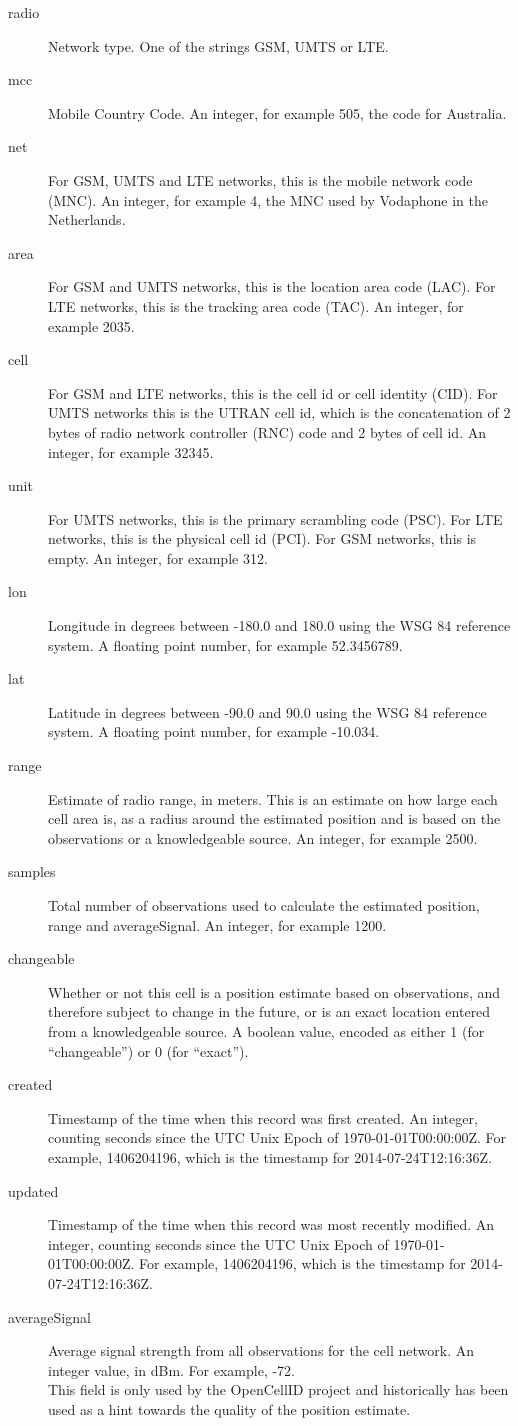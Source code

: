 \begin{description}
 \item[radio] Network type. One of the strings GSM, UMTS or LTE.
 \item[mcc] Mobile Country Code. An integer, for example 505, the code for Australia.
 \item[net] For GSM, UMTS and LTE networks, this is the mobile network code (MNC). An integer, for example 4, the MNC used by Vodaphone in the Netherlands.
 \item[area] For GSM and UMTS networks, this is the location area code (LAC). For LTE networks, this is the tracking area code (TAC). An integer, for example 2035.
 \item[cell] For GSM and LTE networks, this is the cell id or cell identity (CID). For UMTS networks this is the UTRAN cell id, which is the concatenation of 2 bytes of radio network controller (RNC) code and 2 bytes of cell id. An integer, for example 32345.
 \item[unit] For UMTS networks, this is the primary scrambling code (PSC). For LTE networks, this is the physical cell id (PCI). For GSM networks, this is empty. An integer, for example 312.
 \item[lon] Longitude in degrees between -180.0 and 180.0 using the WSG 84 reference system. A floating point number, for example 52.3456789.
 \item[lat] Latitude in degrees between -90.0 and 90.0 using the WSG 84 reference system. A floating point number, for example -10.034.
 \item[range] Estimate of radio range, in meters. This is an estimate on how large each cell area is, as a radius around the estimated position and is based on the observations or a knowledgeable source. An integer, for example 2500.
 \item[samples] Total number of observations used to calculate the estimated position, range and averageSignal. An integer, for example 1200.
 \item[changeable] Whether or not this cell is a position estimate based on observations, and therefore subject to change in the future, or is an exact location entered from a knowledgeable source. A boolean value, encoded as either 1 (for “changeable”) or 0 (for “exact”).
 \item[created] Timestamp of the time when this record was first created. An integer, counting seconds since the UTC Unix Epoch of 1970-01-01T00:00:00Z. For example, 1406204196, which is the timestamp for 2014-07-24T12:16:36Z.
 \item[updated] Timestamp of the time when this record was most recently modified. An integer, counting seconds since the UTC Unix Epoch of 1970-01-01T00:00:00Z. For example, 1406204196, which is the timestamp for 2014-07-24T12:16:36Z.
 \item[averageSignal] Average signal strength from all observations for the cell network. An integer value, in dBm. For example, -72.\\
 This field is only used by the OpenCellID project and historically has been used as a hint towards the quality of the position estimate.
\end{description}

